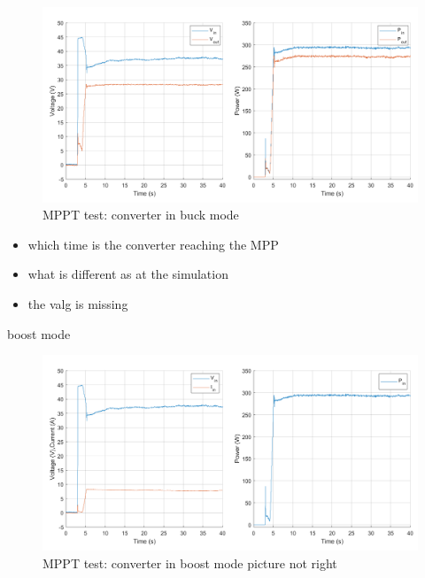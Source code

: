 \begin{figure}[H]
	\begin{center}
		\includegraphics[width=1\textwidth]{../Pictures/P1/Test/Buck_mode_MPPT_Vin_Vout_Pin_Pout}
		\caption{MPPT test: converter in buck mode}
		\label{MPPTtestbuckmode2}
	\end{center}	
\end{figure}



\begin{itemize}
	\item which time is the converter reaching the MPP 
	
	\item what is different as at the simulation
	
	\item the valg is missing
\end{itemize}

boost mode

\begin{figure}[H]
	\begin{center}
		\includegraphics[width=1\textwidth]{../Pictures/P1/Test/Buck_mode_MPPT_Vin_Iin_Pin}
		\caption{MPPT test: converter in boost mode picture not right}
		\label{MPPTtestboostmode1}
	\end{center}	
\end{figure}

